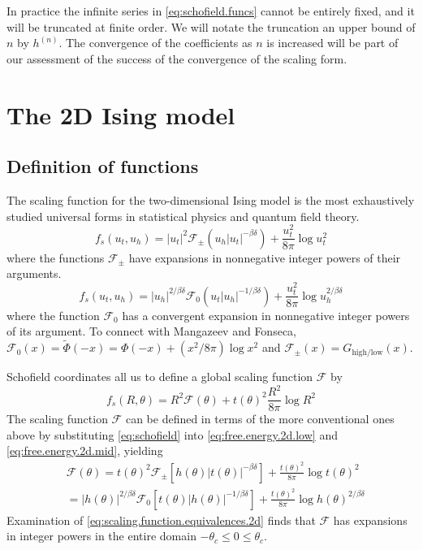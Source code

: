 \documentclass[
  aps,
  prb,
  reprint,
  longbibliography,
  floatfix
]{revtex4-2}
\begin{document}
In practice the infinite series in \eqref{eq:schofield.funcs} cannot be
entirely fixed, and it will be truncated at finite order. We will notate the
truncation an upper bound of $n$ by $h^{(n)}$. The convergence of the
coefficients as $n$ is increased will be part of our assessment of the success
of the convergence of the scaling form.

\section{The 2D Ising model}

\subsection{Definition of functions}

The scaling function for the two-dimensional Ising model is the most
exhaustively studied universal forms in statistical physics and quantum field
theory.
\begin{equation} \label{eq:free.energy.2d.low}
  f_s(u_t, u_h)
  = |u_t|^2\mathcal F_{\pm}(u_h|u_t|^{-\beta\delta})
    +\frac{u_t^2}{8\pi}\log u_t^2
\end{equation}
where the functions $\mathcal F_\pm$ have expansions in nonnegative integer powers of their arguments.
\begin{equation} \label{eq:free.energy.2d.mid}
  f_s(u_t, u_h)
  = |u_h|^{2/\beta\delta}\mathcal F_0(u_t|u_h|^{-1/\beta\delta})
    +\frac{u_t^2}{8\pi}\log u_h^{2/\beta\delta}
\end{equation}
where the function $\mathcal F_0$ has a convergent expansion in nonnegative integer powers of its argument.
To connect with Mangazeev and Fonseca, $\mathcal F_0(x)=\tilde\Phi(-x)=\Phi(-x)+(x^2/8\pi) \log x^2$ and $\mathcal F_\pm(x)=G_{\mathrm{high}/\mathrm{low}}(x)$.

Schofield coordinates all us to define a global scaling function $\mathcal F$ by
\begin{equation} \label{eq:schofield.2d.free.energy}
  f_s(R, \theta) = R^2\mathcal F(\theta) + t(\theta)^2\frac{R^2}{8\pi}\log R^2
\end{equation}
The scaling function $\mathcal F$ can be defined in terms of the more
conventional ones above by substituting \eqref{eq:schofield} into \eqref{eq:free.energy.2d.low} and
\eqref{eq:free.energy.2d.mid}, yielding
\begin{equation} \label{eq:scaling.function.equivalences.2d}
  \begin{aligned}
    &\mathcal F(\theta)
    =t(\theta)^2\mathcal F_\pm\left[h(\theta)|t(\theta)|^{-\beta\delta}\right]
      +\frac{t(\theta)^2}{8\pi}\log t(\theta)^2 \\
    &=|h(\theta)|^{2/\beta\delta}\mathcal F_0\left[t(\theta)|h(\theta)|^{-1/\beta\delta}\right]
      +\frac{t(\theta)^2}{8\pi}\log h(\theta)^{2/\beta\delta}
  \end{aligned}
\end{equation}
Examination of \eqref{eq:scaling.function.equivalences.2d} finds that $\mathcal F$ has expansions in integer powers in the entire domain $-\theta_c\leq0\leq\theta_c$.
\end{document}
